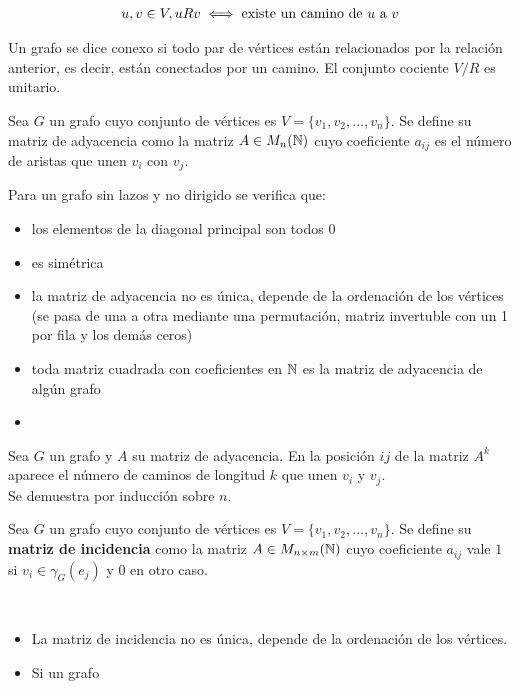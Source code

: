 \begin{align*}
    u,v\in V, uRv \iff \text{existe un camino de $u$ a $v$}
\end{align*}

\begin{definicion}
    Un grafo se dice conexo si todo par de vértices están relacionados por la relación anterior, es decir, están conectados por un camino. El conjunto cociente $V/R$ es unitario.
\end{definicion}

\begin{definicion}
    Sea $G$ un grafo cuyo conjunto de vértices es $V=\{v_1,v_2,\dots,v_n\}$. Se define su matriz de adyacencia como la matriz $A\in M_n(\mathbb{N})$ cuyo coeficiente $a_{ij}$ es el número de aristas que unen $v_i$ con $v_j$.
\end{definicion}

\begin{propiedades}
    Para un grafo sin lazos y no dirigido se verifica que:
    \begin{itemize}
        \item los elementos de la diagonal principal son todos 0
        \item es simétrica
        \item la matriz de adyacencia no es única, depende de la ordenación de los vértices (se pasa de una a otra mediante una permutación, matriz invertuble con un 1 por fila y los demás ceros)
        \item toda matriz cuadrada con coeficientes en $\mathbb{N}$ es la matriz de adyacencia de algún grafo
        \item %
    \end{itemize}
\end{propiedades}

\begin{teo}
    Sea $G$ un grafo y $A$ su matriz de adyacencia. En la posición $ij$ de la matriz $A^k$ aparece el número de caminos de longitud $k$ que unen $v_i$ y $v_j$.\\

    Se demuestra por inducción sobre $n$.
\end{teo}

\begin{definicion}
    Sea $G$ un grafo cuyo conjunto de vértices es $V=\{v_1,v_2,\dots,v_n\}$. Se define su \textbf{matriz de incidencia} como la matriz $A\in M_{n\times m}(\mathbb{N})$ cuyo coeficiente $a_{ij}$ vale $1$ si $v_i\in \gamma_G(e_j)$ y $0$ en otro caso. 
\end{definicion}

\begin{propiedades}\
    \begin{itemize}
        \item La matriz de incidencia no es única, depende de la ordenación de los vértices.
        \item Si un grafo %
    \end{itemize}
\end{propiedades}


